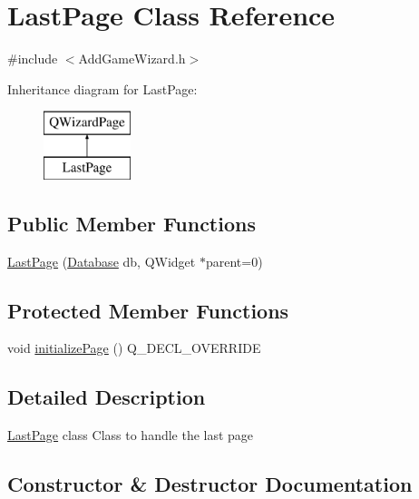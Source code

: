 \hypertarget{class_last_page}{}\section{Last\+Page Class Reference}
\label{class_last_page}


{\ttfamily \#include $<$Add\+Game\+Wizard.\+h$>$}

Inheritance diagram for Last\+Page\+:\begin{figure}[H]
\begin{center}
\leavevmode
\includegraphics[height=2.000000cm]{class_last_page}
\end{center}
\end{figure}
\subsection*{Public Member Functions}
\begin{DoxyCompactItemize}
\item 
\hyperlink{class_last_page_afe215be6054574643680d3d92675076f}{Last\+Page} (\hyperlink{class_database}{Database} db, Q\+Widget $\ast$parent=0)
\end{DoxyCompactItemize}
\subsection*{Protected Member Functions}
\begin{DoxyCompactItemize}
\item 
void \hyperlink{class_last_page_a1dff924481806ed90ce21c2153e3898e}{initialize\+Page} () Q\+\_\+\+D\+E\+C\+L\+\_\+\+O\+V\+E\+R\+R\+I\+D\+E
\end{DoxyCompactItemize}


\subsection{Detailed Description}
\hyperlink{class_last_page}{Last\+Page} class Class to handle the last page 

\subsection{Constructor \& Destructor Documentation}
\hypertarget{class_last_page_afe215be6054574643680d3d92675076f}{}
